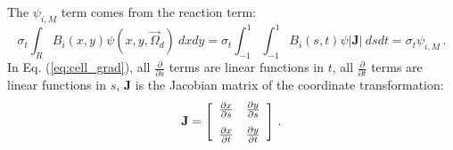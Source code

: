 \documentclass{mc2015}
\newcommand{\benum}{\begin{equation}} 			%
\newcommand{\eenum}{\end{equation}}
\newcommand{\eqt}[1]{Eq. (\ref{#1})}  %
\newcommand{\B}[1]{\ensuremath{{B_{#1} }}}
\newcommand{\p}{\ensuremath{ \partial}}
\newcommand{\abs}[1]{\ensuremath{\left\lvert #1 \right\rvert}}
\newcommand{\omg}{\ensuremath{\vec{\Omega}}}
\newcommand{\pep}{\, .}
\begin{document}
The $\psi_{i,M}$ term comes from the reaction term:
\benum
\sigma_t\int_R{ \B{i}(x,y) \psi(x,y,\omg_d)~dxdy} = \sigma_t\int_{-1}^1{\int_{-1}^1{ \B{i}(s,t) \psi \abs{\mathbf J}~dsdt}} = \sigma_t \psi_{i,M} \pep
\eenum
In \eqt{eq:cell_grad},  all $\frac{\p}{\p s}$ terms are linear functions in $t$, all $\frac{\p}{\p t}$ terms are linear functions in $s$, $\mathbf{J}$ is the Jacobian matrix of the coordinate transformation:
\benum
\mathbf{J} = \left[ \begin{array}{cc} 
\frac{\p x}{\p s} & \frac{\p y}{\p s} \vspace{0.1in}\\
\frac{\p x}{\p t} & \frac{\p y}{\p t}
\end{array}\right] \pep
\eenum
\end{document}
